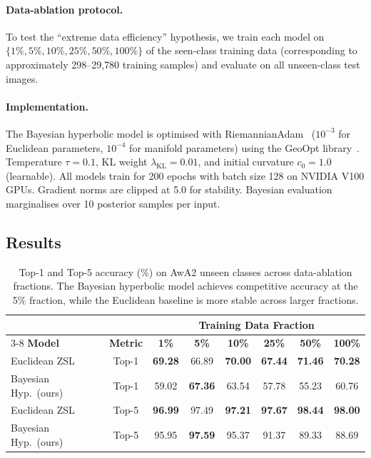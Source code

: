 \documentclass{article}
\DeclareMathOperator{\KL}{KL}
\begin{document}
\paragraph{Data-ablation protocol.}
To test the ``extreme data efficiency'' hypothesis, we train each model on $\{1\%, 5\%, 10\%, 25\%, 50\%, 100\%\}$ of the seen-class training data (corresponding to approximately 298--29{,}780 training samples) and evaluate on all unseen-class test images.

\paragraph{Implementation.}
The Bayesian hyperbolic model is optimised with RiemannianAdam~\cite{becigneul2019riemannian} ($10^{-3}$ for Euclidean parameters, $10^{-4}$ for manifold parameters) using the GeoOpt library~\cite{kochurov2020geoopt}.
Temperature $\tau = 0.1$, KL weight $\lambda_{\KL} = 0.01$, and initial curvature $c_0 = 1.0$ (learnable).
All models train for 200 epochs with batch size 128 on NVIDIA V100 GPUs.
Gradient norms are clipped at 5.0 for stability.
Bayesian evaluation marginalises over 10 posterior samples per input.

\subsection{Results}

\begin{table}[t]
\centering
\caption{Top-1 and Top-5 accuracy (\%) on AwA2 unseen classes across data-ablation fractions. The Bayesian hyperbolic model achieves competitive accuracy at the 5\% fraction, while the Euclidean baseline is more stable across larger fractions.}
\label{tab:accuracy}
\begin{tabular}{lccccccc}
\toprule
 & & \multicolumn{6}{c}{\textbf{Training Data Fraction}} \\
\cmidrule(lr){3-8}
\textbf{Model} & \textbf{Metric} & \textbf{1\%} & \textbf{5\%} & \textbf{10\%} & \textbf{25\%} & \textbf{50\%} & \textbf{100\%} \\
\midrule
Euclidean ZSL & Top-1 & \textbf{69.28} & 66.89 & \textbf{70.00} & \textbf{67.44} & \textbf{71.46} & \textbf{70.28} \\
Bayesian Hyp.\ (ours) & Top-1 & 59.02 & \textbf{67.36} & 63.54 & 57.78 & 55.23 & 60.76 \\
\midrule
Euclidean ZSL & Top-5 & \textbf{96.99} & 97.49 & \textbf{97.21} & \textbf{97.67} & \textbf{98.44} & \textbf{98.00} \\
Bayesian Hyp.\ (ours) & Top-5 & 95.95 & \textbf{97.59} & 95.37 & 91.37 & 89.33 & 88.69 \\
\bottomrule
\end{tabular}
\end{table}
\end{document}
